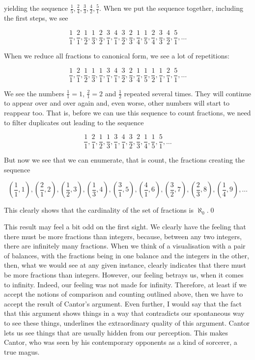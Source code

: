 \documentclass[tikz]{scrreprt}
\begin{document}
yielding the sequence
$\frac{1}{5}, 
 \frac{2}{4}, 
 \frac{3}{3}, 
 \frac{4}{2},
 \frac{5}{1}$. 
When we put the sequence together,
including the first steps,
we see

\[
 \frac{1}{1},
 \frac{2}{1}, 
 \frac{1}{2}, 
 \frac{1}{3}, 
 \frac{2}{2}, 
 \frac{3}{1}, 
 \frac{4}{1}, 
 \frac{3}{2}, 
 \frac{2}{3}, 
 \frac{1}{4}, 
 \frac{1}{5}, 
 \frac{2}{4}, 
 \frac{3}{3}, 
 \frac{4}{2},
 \frac{5}{1},
 \dots
\] 

When we reduce all fractions to canonical form,
we see a lot of repetitions:

\[
 \frac{1}{1},
 \frac{2}{1}, 
 \frac{1}{2}, 
 \frac{1}{3}, 
 \frac{1}{1}, 
 \frac{3}{1}, 
 \frac{4}{1}, 
 \frac{3}{2}, 
 \frac{2}{3}, 
 \frac{1}{4}, 
 \frac{1}{5}, 
 \frac{1}{2}, 
 \frac{1}{1}, 
 \frac{2}{1},
 \frac{5}{1},
 \dots
\] 

We see the numbers 
$\frac{1}{1} = 1$,
$\frac{2}{1} = 2$ and
$\frac{1}{2}$ repeated several times.
They will continue to appear over and over again and,
even worse, other numbers will start to reappear too.
That is, before we can use this sequence to count
fractions, we need to filter duplicates out
leading to the sequence

\[
 \frac{1}{1},
 \frac{2}{1}, 
 \frac{1}{2}, 
 \frac{1}{3}, 
 \frac{3}{1}, 
 \frac{4}{1}, 
 \frac{3}{2}, 
 \frac{2}{3}, 
 \frac{1}{4}, 
 \frac{1}{5}, 
 \frac{5}{1},
 \dots
\]

But now we see that we can enumerate, that is count,
the fractions creating the sequence

\[
 \left(\frac{1}{1},1\right),
 \left(\frac{2}{1},2\right), 
 \left(\frac{1}{2},3\right), 
 \left(\frac{1}{3},4\right), 
 \left(\frac{3}{1},5\right), 
 \left(\frac{4}{1},6\right), 
 \left(\frac{3}{2},7\right), 
 \left(\frac{2}{3},8\right), 
 \left(\frac{1}{4},9\right), 
 \dots
\]

This clearly shows that the cardinality 
of the set of fractions is $\aleph_0$.\qed

This result may feel a bit odd on the first sight.
We clearly have the feeling that there must
be more fractions than integers, because,
between any two integers, there are infinitely many
fractions. 
When we think of a visualisation with a pair of balances,
with the fractions being in one balance and the integers
in the other, then, what we would see at any given instance, 
clearly indicates that there must be more fractions than integers.
However, our feeling betrays us, when it comes
to infinity. Indeed, our feeling was not made for infinity.
Therefore, at least if we accept the notions
of comparison and counting outlined above,
then we have to accept the result of Cantor's
argument.
Even further, I would say that the fact that this argument
shows things in a way that contradicts our spontaneous
way to see these things, underlines
the extraordinary quality of this argument.
Cantor lets us see things that are usually
hidden from our perception.
This makes Cantor, who was seen by his
contemporary opponents as a kind of sorcerer,
a true magus.
\end{document}
